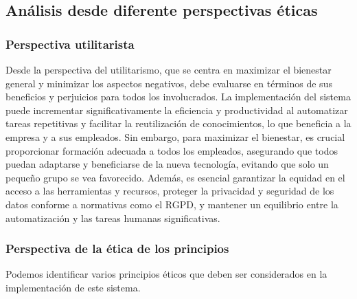 \subsection{Análisis desde diferente perspectivas éticas}
\subsubsection{Perspectiva utilitarista}
Desde la perspectiva del utilitarismo, que se centra en maximizar el bienestar 
general y minimizar los aspectos negativos, debe evaluarse en términos de sus 
beneficios y perjuicios para todos los involucrados. La implementación del sistema 
puede incrementar significativamente la eficiencia 
y productividad al automatizar tareas repetitivas y facilitar la reutilización 
de conocimientos, lo que beneficia a la empresa y a sus empleados. Sin embargo, 
para maximizar el bienestar, es crucial proporcionar formación adecuada a todos 
los empleados, asegurando que todos puedan adaptarse y beneficiarse de la nueva 
tecnología, evitando que solo un pequeño grupo se vea favorecido. Además, es 
esencial garantizar la equidad en el acceso a las herramientas y recursos, proteger 
la privacidad y seguridad de los datos conforme a normativas como el RGPD, y 
mantener un equilibrio entre la automatización y las tareas humanas significativas.

\subsubsection{Perspectiva de la ética de los principios}
Podemos identificar varios principios éticos que deben ser considerados en la
implementación de este sistema.

